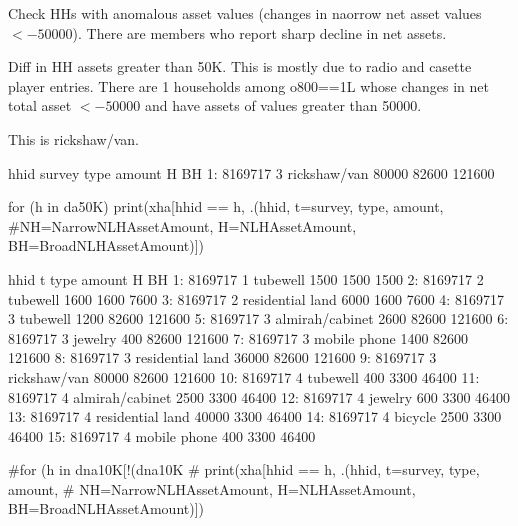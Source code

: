 Check HHs with anomalous asset values (changes in naorrow net asset values $<-50000$). There are members who report sharp decline in net assets. 
\begin{description}
\vspace{1.0ex}\setlength{\itemsep}{1.0ex}\setlength{\baselineskip}{12pt}
\item[da50K]	Diff in HH assets greater than 50K. This is mostly due to radio and casette player entries. There are 1 households among \textsf{o800==1L} whose changes in net total asset $< -50000$ and have assets of values greater than 50000.
\end{description}
This is rickshaw/van.
\begin{Schunk}
\begin{Soutput}
      hhid survey         type amount     H     BH
1: 8169717      3 rickshaw/van  80000 82600 121600
\end{Soutput}
\end{Schunk}
\begin{Schunk}
\begin{Sinput}
for (h in da50K)
  print(xha[hhid == h, .(hhid, t=survey, type, amount, 
    #NH=NarrowNLHAssetAmount, 
    H=NLHAssetAmount, BH=BroadNLHAssetAmount)])
\end{Sinput}
\begin{Soutput}
       hhid t             type amount     H     BH
 1: 8169717 1         tubewell   1500  1500   1500
 2: 8169717 2         tubewell   1600  1600   7600
 3: 8169717 2 residential land   6000  1600   7600
 4: 8169717 3         tubewell   1200 82600 121600
 5: 8169717 3  almirah/cabinet   2600 82600 121600
 6: 8169717 3          jewelry    400 82600 121600
 7: 8169717 3     mobile phone   1400 82600 121600
 8: 8169717 3 residential land  36000 82600 121600
 9: 8169717 3     rickshaw/van  80000 82600 121600
10: 8169717 4         tubewell    400  3300  46400
11: 8169717 4  almirah/cabinet   2500  3300  46400
12: 8169717 4          jewelry    600  3300  46400
13: 8169717 4 residential land  40000  3300  46400
14: 8169717 4          bicycle   2500  3300  46400
15: 8169717 4     mobile phone    400  3300  46400
\end{Soutput}
\begin{Sinput}
#for (h in dna10K[!(dna10K %in% da50K)])
#  print(xha[hhid == h, .(hhid, t=survey, type, amount, 
#    NH=NarrowNLHAssetAmount, H=NLHAssetAmount, BH=BroadNLHAssetAmount)])
\end{Sinput}
\end{Schunk}

